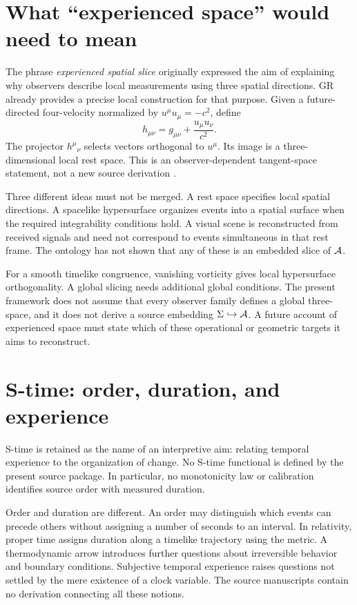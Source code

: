 \documentclass[11pt]{article}
\begin{document}
\section{What ``experienced space'' would need to mean}
The phrase \emph{experienced spatial slice} originally expressed the aim of explaining why observers describe local measurements using three spatial directions. GR already provides a precise local construction for that purpose. Given a future-directed four-velocity normalized by $u^\mu u_\mu=-c^2$, define
\begin{equation}
h_{\mu\nu}=g_{\mu\nu}+\frac{u_\mu u_\nu}{c^2}.
\end{equation}
The projector $h^\mu{}_{\nu}$ selects vectors orthogonal to $u^\mu$. Its image is a three-dimensional local rest space. This is an observer-dependent tangent-space statement, not a new source derivation \parencite{EllisVanElst1999}.

Three different ideas must not be merged. A rest space specifies local spatial directions. A spacelike hypersurface organizes events into a spatial surface when the required integrability conditions hold. A visual scene is reconstructed from received signals and need not correspond to events simultaneous in that rest frame. The ontology has not shown that any of these is an embedded slice of $\mathcal A$.

For a smooth timelike congruence, vanishing vorticity gives local hypersurface orthogonality. A global slicing needs additional global conditions. The present framework does not assume that every observer family defines a global three-space, and it does not derive a source embedding $\Sigma\hookrightarrow\mathcal A$. A future account of experienced space must state which of these operational or geometric targets it aims to reconstruct.

\section{S-time: order, duration, and experience}
S-time is retained as the name of an interpretive aim: relating temporal experience to the organization of change. No S-time functional is defined by the present source package. In particular, no monotonicity law or calibration identifies source order with measured duration.

Order and duration are different. An order may distinguish which events can precede others without assigning a number of seconds to an interval. In relativity, proper time assigns duration along a timelike trajectory using the metric. A thermodynamic arrow introduces further questions about irreversible behavior and boundary conditions. Subjective temporal experience raises questions not settled by the mere existence of a clock variable. The source manuscripts contain no derivation connecting all these notions.
\end{document}
